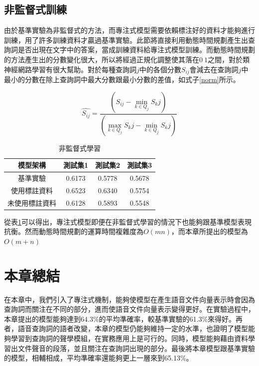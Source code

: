 \subsection{非監督式訓練}

由於基準實驗為非監督式的方法，而專注式模型需要依賴標注好的資料才能夠進行訓練，用了許多訓練資料才贏過基準實驗。此節將直接利用動態時間規劃產生出查詢詞是否出現在文字中的答案，當成訓練資料給專注式模型訓練。而動態時間規劃的方法產生出的分數變化很大，所以將經過正規化調整使其落在$0~1$之間，對於類神經網路學習有很大幫助。對於每種查詢詞$j$中的各個分數$S_{ij}$會減去在查詢詞$j$中最小的分數在除上查詢詞中最大分數跟最小分數的差值，如式子\ref{norm}所示。

\begin{equation}
\label{norm}
\hat{S_{ij}} = \frac{(S_{ij}- \min_{k \in Q_j} S_kj)} { (\max_{k \in
		Q_j} S_kj - \min_{k \in Q_j} S_kj)}
\end{equation}
\begin{table}[ht]
	 \centering
	 \caption{非監督式學習}
	 \label{table:ch4_unsup}
	 \begin{tabular}{|c|c|c|c|c|}
		 \hline
		 \multicolumn{2}{|c|}{模型架構} & 測試集1 & 測試集2 & 測試集3 \\
		 \hline
		 \multicolumn{2}{|c|}{基準實驗} & 0.6173 & 0.5778 & 0.5678\\
		 \hline
		 \multicolumn{2}{|c|}{使用標註資料} &0.6523&0.6340 &0.5754 \\
		 \hline
		 \multicolumn{2}{|c|}{未使用標註資料} &0.6128&0.5893 &0.5548 \\
		 \hline
	   \end{tabular}
\end{table}

從表\ref{table:ch4_unsup}可以得出，專注式模型即便在非監督式學習的情況下也能夠跟基準模型表現抗衡。然而動態時間規劃的運算時間複雜度為$O(mn)$，而本章所提出的模型為$O(m+n)$
\section{本章總結}
在本章中，我們引入了專注式機制，能夠使模型在產生語音文件向量表示時會因為查詢詞而關注在不同的部分，進而使語音文件向量表示變得更好。在實驗過程中，本章提出的模型能夠達到64.3\%的平均準確率，較基準實驗的61.3\%來得好。再者，語音查詢詞的語者改變，本章的模型仍能夠維持一定的水準，也證明了模型能夠學習到查詢詞的聲學模組，在實務應用上是可行的。同時，模型能夠藉由資料學習出文件聲音的段落，並且關注在查詢詞出現的部分。最後將本章模型跟基準實驗的模型，相輔相成，平均準確率還能夠更上一層來到65.13\%。
